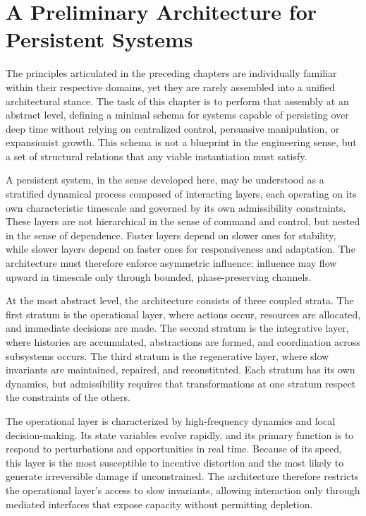 \documentclass[12pt,oneside]{book}
\begin{document}
\chapter{A Preliminary Architecture for Persistent Systems}

The principles articulated in the preceding chapters are individually familiar within their respective domains, yet they are rarely assembled into a unified architectural stance. The task of this chapter is to perform that assembly at an abstract level, defining a minimal schema for systems capable of persisting over deep time without relying on centralized control, persuasive manipulation, or expansionist growth. This schema is not a blueprint in the engineering sense, but a set of structural relations that any viable instantiation must satisfy.

A persistent system, in the sense developed here, may be understood as a stratified dynamical process composed of interacting layers, each operating on its own characteristic timescale and governed by its own admissibility constraints. These layers are not hierarchical in the sense of command and control, but nested in the sense of dependence. Faster layers depend on slower ones for stability, while slower layers depend on faster ones for responsiveness and adaptation. The architecture must therefore enforce asymmetric influence: influence may flow upward in timescale only through bounded, phase-preserving channels.

At the most abstract level, the architecture consists of three coupled strata. The first stratum is the operational layer, where actions occur, resources are allocated, and immediate decisions are made. The second stratum is the integrative layer, where histories are accumulated, abstractions are formed, and coordination across subsystems occurs. The third stratum is the regenerative layer, where slow invariants are maintained, repaired, and reconstituted. Each stratum has its own dynamics, but admissibility requires that transformations at one stratum respect the constraints of the others.

The operational layer is characterized by high-frequency dynamics and local decision-making. Its state variables evolve rapidly, and its primary function is to respond to perturbations and opportunities in real time. Because of its speed, this layer is the most susceptible to incentive distortion and the most likely to generate irreversible damage if unconstrained. The architecture therefore restricts the operational layer’s access to slow invariants, allowing interaction only through mediated interfaces that expose capacity without permitting depletion.
\end{document}
